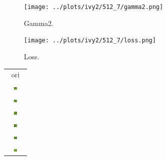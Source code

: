 \documentclass[letter]{article}
\begin{document}
\begin{figure}[h!]
	\centering
	\texttt{[image: ../plots/ivy2/512\_7/gamma2.png]}
	\caption{\label{fig:gamma1}Gamma2.}
\end{figure}

\begin{figure}[h!]
	\centering
	\texttt{[image: ../plots/ivy2/512\_7/loss.png]}
	\caption{\label{fig:gamma1}Loss.}
\end{figure}

\newpage

\begin{table}[h!]
	\centering
	\begin{tabular}{c}
		ori\tabularnewline
		\includegraphics[width=0.17\textwidth]{../data/ivy2/512/1} \tabularnewline		\includegraphics[width=0.17\textwidth]{../data/ivy2/512/2} \tabularnewline		\includegraphics[width=0.17\textwidth]{../data/ivy2/512/3} \tabularnewline		\includegraphics[width=0.17\textwidth]{../data/ivy2/512/4} \tabularnewline		\includegraphics[width=0.17\textwidth]{../data/ivy2/512/5} \tabularnewline		\includegraphics[width=0.17\textwidth]{../data/ivy2/512/6} \tabularnewline

\end{tabular}
\end{table}
\end{document}
